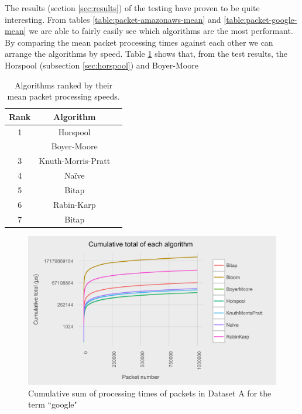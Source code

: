 \documentclass{article}
\begin{document}
The results (section \ref{sec:results}) of the testing have proven to be quite interesting. From tables \ref{table:packet-amazonaws-mean} and \ref{table:packet-google-mean} we are able to fairly easily see which algorithms are the most performant. By comparing the mean packet processing times against each other we can arrange the algorithms by speed. Table \ref{table:ranked-mean-packet-processing-time} shows that, from the test results, the Horspool (subsection \ref{sec:horspool}) and Boyer-Moore

\begin{table}[hbt]
  \centering
  \begin{tabular}{c|cc}
    Rank & Algorithm\\
    \hline
    1 & Horspool \\
      & Boyer-Moore \\
    3 & Knuth-Morris-Pratt \\
    4 & Na{\"i}ve \\
    5 & Bitap \\
    6 & Rabin-Karp \\
    7 & Bitap 
  \end{tabular}
  \caption{Algorithms ranked by their mean packet processing speeds.}
  \label{table:ranked-mean-packet-processing-time}
\end{table}


\begin{figure}[h!bt]
  \centering
  \includegraphics[width=\textwidth]{graphs/cum_sum_packets_google.png}
  \caption{Cumulative sum of processing times of packets in Dataset A for the term ``google"}
\end{figure}
\end{document}
